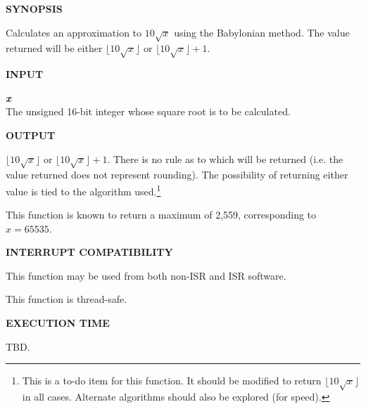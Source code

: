 \noindent\textbf{SYNOPSIS}
\begin{list}{}{\setlength{\leftmargin}{0.25in}\setlength{\topsep}{0.0in}}
\item
Calculates an approximation to $10 \sqrt{x}$ using the Babylonian method.
The value returned will be either $\lfloor 10 \sqrt{x} \rfloor$ 
or $\lfloor 10 \sqrt{x} \rfloor + 1$.
\end{list}
\vspace{2.8ex}

\noindent\textbf{INPUT}
\begin{list}{}{\setlength{\leftmargin}{0.5in}\setlength{\itemindent}{-0.25in}\setlength{\topsep}{0.0in}\setlength{\partopsep}{0.0in}}
\item \emph{\textbf{x}}\\
      The unsigned 16-bit integer whose square root is to be calculated.
\end{list}
\vspace{2.8ex}

\noindent\textbf{OUTPUT}
\begin{list}{}{\setlength{\leftmargin}{0.25in}\setlength{\topsep}{0.0in}}
\item $\lfloor 10 \sqrt{x} \rfloor$ or $\lfloor 10 \sqrt{x} \rfloor + 1$.  There is
      no rule as to which will be returned (i.e. the value returned does not
      represent rounding).  The possibility of returning either value is tied
      to the algorithm used.\footnote{This is a to-do item for this function.
      It should be modified to return $\lfloor 10 \sqrt{x} \rfloor$ in
      all cases.  Alternate algorithms should also be explored (for speed).}
\item This function is known to return a maximum of 2,559,
      corresponding to $x = 65535$.
\end{list}
\vspace{2.8ex}

\noindent\textbf{INTERRUPT COMPATIBILITY}
\begin{list}{}{\setlength{\leftmargin}{0.25in}\setlength{\topsep}{0.0in}}
\item This function may be used from both non-ISR and ISR software.
\item This function is thread-safe.
\end{list}
\vspace{2.8ex}

\noindent\textbf{EXECUTION TIME}
\begin{list}{}{\setlength{\leftmargin}{0.25in}\setlength{\topsep}{0.0in}}
\item TBD.
\end{list}
\vspace{2.8ex}

